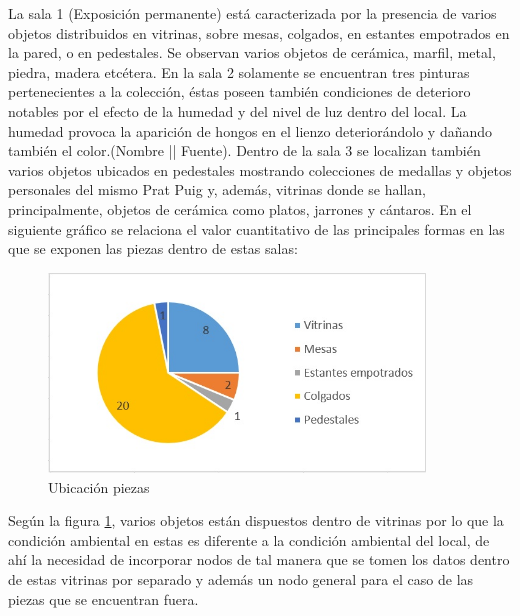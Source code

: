     La sala 1 (Exposición permanente) está caracterizada por la presencia de varios objetos distribuidos en vitrinas, sobre mesas, colgados, en estantes empotrados en la pared, o en pedestales. Se observan varios objetos de cerámica, marfil, metal, piedra, madera etcétera.\newline
    En la sala 2 solamente se encuentran tres pinturas pertenecientes a la colección, éstas poseen también condiciones de deterioro notables por el efecto de la humedad y del nivel de luz dentro del local. La humedad provoca la aparición de hongos en el lienzo deteriorándolo y dañando también el color. (Nombre || Fuente).\newline
    Dentro de la sala 3 se localizan también varios objetos ubicados en pedestales mostrando colecciones de medallas y objetos personales del mismo Prat Puig y, además, vitrinas donde se hallan, principalmente, objetos de cerámica como platos, jarrones y cántaros.\newline
    En el siguiente gráfico se relaciona el valor cuantitativo de las principales formas en las que se exponen las piezas dentro de estas salas:\newline

    \begin{figure}[h]
        \centering
        \includegraphics[width=10cm, height=5.3cm]{imagenes/formas expositivas.jpg}
        \caption{Ubicación piezas}
        \label{imag:ubicacion_piezas}
    \end{figure}

    Según la figura \ref{imag:ubicacion_piezas}, varios objetos están dispuestos dentro de vitrinas por lo que la condición ambiental en estas es diferente a la condición ambiental del local, de ahí la necesidad de incorporar nodos de tal manera que se tomen los datos dentro de estas vitrinas por separado y además un nodo general para el caso de las piezas que se encuentran fuera.

